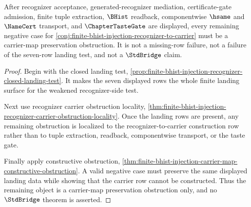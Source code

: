 \begin{theorem}
\label{thm:finite-bhist-injection-carrier-map-obstruction-stability}
After recognizer acceptance, generated-recognizer mediation, certificate-gate admission, finite tuple extraction, $\BHist$ readback, componentwise $\hsame$ and $\NameCert$ transport, and $\ChapterTasteGate$ are displayed, every remaining negative case for \autoref{conj:finite-bhist-injection-recognizer-to-carrier} must be a carrier-map preservation obstruction. It is not a missing-row failure, not a failure of the seven-row landing test, and not a $\StdBridge$ claim.
\end{theorem}
\begin{proof}
Begin with the closed landing test, \autoref{prop:finite-bhist-injection-recognizer-closed-landing-test}. It makes the seven displayed rows the whole finite landing surface for the weakened recognizer-side test.

Next use recognizer carrier obstruction locality, \autoref{thm:finite-bhist-injection-recognizer-carrier-obstruction-locality}. Once the landing rows are present, any remaining obstruction is localized to the recognizer-to-carrier construction row rather than to tuple extraction, readback, componentwise transport, or the taste gate.

Finally apply constructive obstruction, \autoref{thm:finite-bhist-injection-carrier-map-constructive-obstruction}. A valid negative case must preserve the same displayed landing data while showing that the carrier row cannot be constructed. Thus the remaining object is a carrier-map preservation obstruction only, and no $\StdBridge$ theorem is asserted.
\end{proof}

